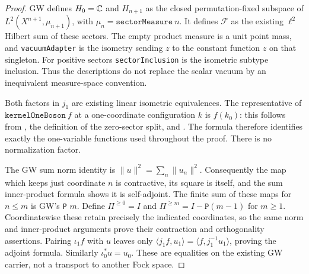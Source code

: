 \documentclass[11pt,a4paper]{article}
\theoremstyle{remark}\newtheorem{remark}[theorem]{Remark}
\newcommand{\F}{\mathcal F}\newcommand{\Q}{\mathcal Q}\newcommand{\HH}{\mathcal H}
\begin{document}
\begin{proof}
GW defines $H_0=\mathbb C$ and $H_{n+1}$ as the closed permutation-fixed subspace of $L^2(X^{n+1},\mu_{n+1})$, with $\mu_n=\texttt{sectorMeasure}\ n$. It defines $\F$ as the existing $\ell^2$ Hilbert sum of these sectors. The empty product measure is a unit point mass, and \texttt{vacuumAdapter} is the isometry sending $z$ to the constant function $z$ on that singleton. For positive sectors \texttt{sectorInclusion} is the isometric subtype inclusion. Thus the descriptions do not replace the scalar vacuum by an inequivalent measure-space convention.

Both factors in $j_1$ are existing linear isometric equivalences. The representative of $\texttt{kernelOneBoson}\ f$ at a one-coordinate configuration $k$ is $f(k_0)$: this follows from , the definition of the zero-sector split, and . The formula therefore identifies exactly the one-variable functions used throughout the proof. There is no normalization factor.

The GW sum norm identity is $\|u\|^2=\sum_n\|u_n\|^2$. Consequently the map which keeps just coordinate $n$ is contractive, its square is itself, and the sum inner-product formula shows it is self-adjoint. The finite sum of these maps for $n\leq m$ is GW's \texttt{P} $m$. Define $\Pi^{\geq0}=I$ and $\Pi^{\geq m}=I-\texttt{P}(m-1)$ for $m\geq1$. Coordinatewise these retain precisely the indicated coordinates, so the same norm and inner-product arguments prove their contraction and orthogonality assertions. Pairing $\iota_1f$ with $u$ leaves only $\langle j_1f,u_1\rangle=\langle f,j_1^{-1}u_1\rangle$, proving the adjoint formula. Similarly $\iota_0^*u=u_0$. These are equalities on the existing GW carrier, not a transport to another Fock space.
\end{proof}
\end{document}
